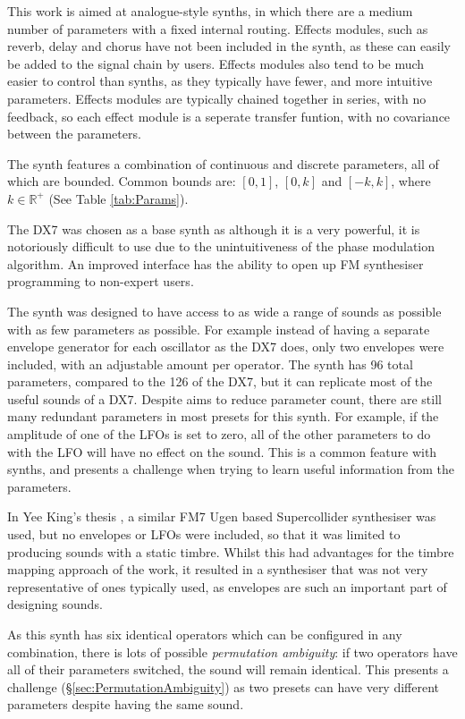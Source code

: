 \documentclass[11pt, oneside]{report}   	%
\begin{document}
This work is aimed at analogue-style synths, in which there are a medium number of parameters with a fixed internal routing. Effects modules, such as reverb, delay and chorus have not been included in the synth, as these can easily be added to the signal chain by users. Effects modules also tend to be much easier to control than synths, as they typically have fewer, and more intuitive parameters. Effects modules are typically chained together in series, with no feedback, so each effect module is a seperate transfer funtion, with no covariance between the parameters.

The synth features a combination of continuous and discrete parameters, all of which are bounded. Common bounds are: $[0, 1]$, $[0, k]$ and $[-k, k]$, where $k \in \mathbb{R}^+ $ (See Table \ref{tab:Params}).

The DX7 was chosen as a base synth as although it is a very powerful, it is notoriously difficult to use due to the unintuitiveness of the phase modulation algorithm. An improved interface has the ability to open up FM synthesiser programming to non-expert users. %

The synth was designed to have access to as wide a range of sounds as possible with as few parameters as possible. For example instead of having a separate envelope generator for each oscillator as the  DX7 does, only two envelopes were included, with an adjustable amount per operator. The synth has 96 total parameters, compared to the 126 of the DX7, but it can replicate most of the useful sounds of a DX7. Despite aims to reduce parameter count, there are still many redundant parameters in most presets for this synth. For example, if the amplitude of one of the LFOs is set to zero, all of the other parameters to do with the LFO will have no effect on the sound. This is a common feature with synths, and presents a challenge when trying to learn useful information from the parameters.

In Yee King's thesis \cite{YeeKing}, a similar FM7 Ugen based Supercollider synthesiser was used, but no envelopes or LFOs were included, so that it was limited to producing sounds with a static timbre. Whilst this had advantages for the timbre mapping approach of the work, it resulted in a synthesiser that was not very representative of ones typically used, as envelopes are such an important part of designing sounds. 

As this synth has six identical operators which can be configured in any combination, there is lots of possible \emph{permutation ambiguity}: if two operators have all of their parameters switched, the sound will remain identical. This presents a challenge (\S \ref{sec:PermutationAmbiguity}) as two presets can have very different parameters despite having the same sound.
\end{document}
